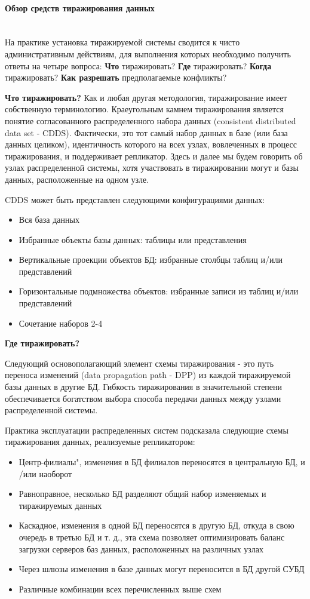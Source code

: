 \paragraph{Обзор средств тиражирования данных}~\\
На практике установка тиражируемой системы сводится к чисто административным действиям, для выполнения которых
необходимо получить ответы на четыре вопроса: \textbf{Что} тиражировать? \textbf{Где} тиражировать? \textbf{Когда}
тиражировать? \textbf{Как разрешать} предполагаемые конфликты?

\bigbreak
\textbf{Что тиражировать?}
Как и любая другая методология, тиражирование имеет собственную терминологию. Краеугольным камнем тиражирования является понятие согласованного распределенного набора данных (consistent distributed data set - CDDS). Фактически, это тот самый набор данных в базе (или база данных целиком), идентичность которого на всех узлах, вовлеченных в процесс тиражирования, и поддерживает репликатор. Здесь и далее мы будем говорить об узлах распределенной системы, хотя участвовать в тиражировании могут и базы данных, расположенные на одном узле.

CDDS может быть представлен следующими конфигурациями данных:
\begin{itemize}
    \item Вся база данных
    \item Избранные объекты базы данных: таблицы или представления
    \item Вертикальные проекции объектов БД: избранные столбцы таблиц и/или представлений
    \item Горизонтальные подмножества объектов: избранные записи из таблиц и/или представлений
    \item Сочетание наборов 2-4
\end{itemize}

\bigbreak
\textbf{Где тиражировать?}

Следующий основополагающий элемент схемы тиражирования - это путь переноса изменений (data propagation path - DPP) из каждой тиражируемой базы данных в другие БД. Гибкость тиражирования в значительной степени обеспечивается богатством выбора способа передачи данных между узлами распределенной системы.

Практика эксплуатации распределенных систем подсказала следующие схемы тиражирования данных, реализуемые репликатором:

\begin{itemize}
    \item Центр-филиалы", изменения в БД филиалов переносятся в центральную БД, и /или наоборот
    \item Равноправное, несколько БД разделяют общий набор изменяемых и тиражируемых данных
    \item Каскадное, изменения в одной БД переносятся в другую БД, откуда в свою очередь в третью БД и т. д., эта схема позволяет оптимизировать баланс загрузки серверов баз данных, расположенных на различных узлах
    \item Через шлюзы изменения в базе данных могут переносится в БД другой СУБД
    \item Различные комбинации всех перечисленных выше схем
\end{itemize}

